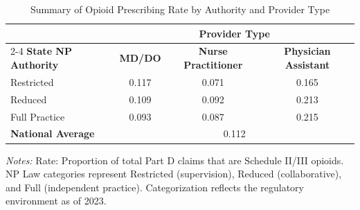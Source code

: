 \begin{table}[htbp]
    \centering
    \caption{Summary of Opioid Prescribing Rate by Authority and Provider Type}
    \label{tab:partd_opioid_rate_provtype}
    \vspace{0.2cm}
    \begin{tabular}{lccc}
        \toprule
        & \multicolumn{3}{c}{\textbf{Provider Type}} \\
        \cmidrule(lr){2-4}
        \textbf{State NP Authority} & \textbf{MD/DO} & \textbf{Nurse Practitioner} & \textbf{Physician Assistant} \\
        \midrule
        Restricted & 0.117 & 0.071 & 0.165 \\
        Reduced & 0.109 & 0.092 & 0.213 \\
        Full Practice & 0.093 & 0.087 & 0.215 \\
        \midrule
        \textbf{National Average} & \multicolumn{3}{c}{0.112} \\
        \bottomrule
    \end{tabular}
    \vspace{0.1cm}
    \begin{minipage}{0.85\textwidth}
        \footnotesize \textit{Notes:} Rate: Proportion of total Part D claims that are Schedule II/III opioids. NP Law categories represent Restricted (supervision), Reduced (collaborative), and Full (independent practice). Categorization reflects the regulatory environment as of 2023.
    \end{minipage}
\end{table}